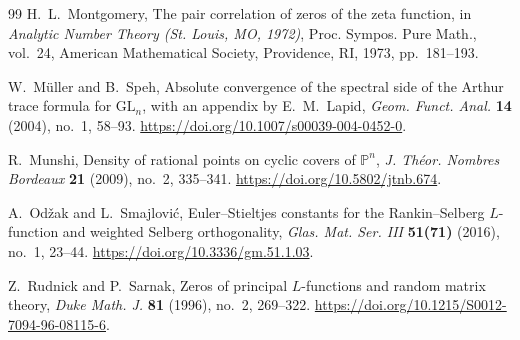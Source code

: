 \documentclass[11pt,reqno]{amsart}
\numberwithin{equation}{section}
\theoremstyle{definition}
\theoremstyle{remark}
\begin{document}
\begin{thebibliography}{99}
H.~L.~Montgomery,
The pair correlation of zeros of the zeta function,
in \emph{Analytic Number Theory (St. Louis, MO, 1972)},
Proc. Sympos. Pure Math., vol.~24,
American Mathematical Society, Providence, RI, 1973, pp.~181--193.

W.~M\"uller and B.~Speh,
Absolute convergence of the spectral side of the Arthur trace formula
for $\mathrm{GL}_n$, with an appendix by E.~M.~Lapid,
\emph{Geom. Funct. Anal.} \textbf{14} (2004), no.~1, 58--93.
\url{https://doi.org/10.1007/s00039-004-0452-0}.

R.~Munshi,
Density of rational points on cyclic covers of $\mathbb P^n$,
\emph{J. Th\'eor. Nombres Bordeaux} \textbf{21} (2009), no.~2, 335--341.
\url{https://doi.org/10.5802/jtnb.674}.

A.~Od\v{z}ak and L.~Smajlovi\'c,
Euler--Stieltjes constants for the Rankin--Selberg $L$-function and
weighted Selberg orthogonality,
\emph{Glas. Mat. Ser. III} \textbf{51(71)} (2016), no.~1, 23--44.
\url{https://doi.org/10.3336/gm.51.1.03}.

Z.~Rudnick and P.~Sarnak,
Zeros of principal $L$-functions and random matrix theory,
\emph{Duke Math. J.} \textbf{81} (1996), no.~2, 269--322.
\url{https://doi.org/10.1215/S0012-7094-96-08115-6}.

\end{thebibliography}
\end{document}
